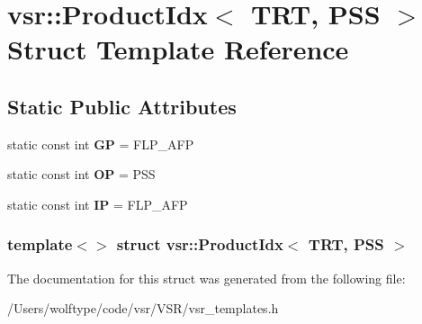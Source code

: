\hypertarget{structvsr_1_1_product_idx_3_01_t_r_t_00_01_p_s_s_01_4}{\section{vsr\-:\-:Product\-Idx$<$ T\-R\-T, P\-S\-S $>$ Struct Template Reference}
\label{structvsr_1_1_product_idx_3_01_t_r_t_00_01_p_s_s_01_4}
}
\subsection*{Static Public Attributes}
\begin{DoxyCompactItemize}
\item 
\hypertarget{structvsr_1_1_product_idx_3_01_t_r_t_00_01_p_s_s_01_4_ae4affcbe01d898fcf3a594439257332b}{static const int {\bfseries G\-P} = F\-L\-P\-\_\-\-A\-F\-P}\label{structvsr_1_1_product_idx_3_01_t_r_t_00_01_p_s_s_01_4_ae4affcbe01d898fcf3a594439257332b}

\item 
\hypertarget{structvsr_1_1_product_idx_3_01_t_r_t_00_01_p_s_s_01_4_a61fb0e924e21f6a850ae5d1b86ad12b5}{static const int {\bfseries O\-P} = P\-S\-S}\label{structvsr_1_1_product_idx_3_01_t_r_t_00_01_p_s_s_01_4_a61fb0e924e21f6a850ae5d1b86ad12b5}

\item 
\hypertarget{structvsr_1_1_product_idx_3_01_t_r_t_00_01_p_s_s_01_4_a25540fccbf4048830c204dbc27052e3e}{static const int {\bfseries I\-P} = F\-L\-P\-\_\-\-A\-F\-P}\label{structvsr_1_1_product_idx_3_01_t_r_t_00_01_p_s_s_01_4_a25540fccbf4048830c204dbc27052e3e}

\end{DoxyCompactItemize}
\subsubsection*{template$<$$>$ struct vsr\-::\-Product\-Idx$<$ T\-R\-T, P\-S\-S $>$}



The documentation for this struct was generated from the following file\-:\begin{DoxyCompactItemize}
\item 
/\-Users/wolftype/code/vsr/\-V\-S\-R/vsr\-\_\-templates.\-h\end{DoxyCompactItemize}
